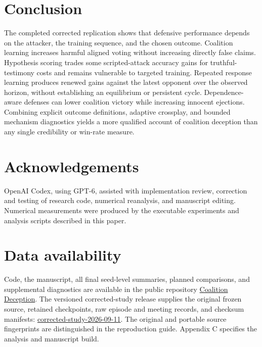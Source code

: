 \documentclass[
  12pt,
]{article}
\begin{document}
\FloatBarrier

\section{Conclusion}\label{conclusion}

The completed corrected replication shows that defensive performance
depends on the attacker, the training sequence, and the chosen outcome.
Coalition learning increases harmful aligned voting without increasing
directly false claims. Hypothesis scoring trades some scripted-attack
accuracy gains for truthful-testimony costs and remains vulnerable to
targeted training. Repeated response learning produces renewed gains
against the latest opponent over the observed horizon, without
establishing an equilibrium or persistent cycle. Dependence-aware
defenses can lower coalition victory while increasing innocent
ejections. Combining explicit outcome definitions, adaptive crossplay,
and bounded mechanism diagnostics yields a more qualified account of
coalition deception than any single credibility or win-rate measure.

\FloatBarrier

\section*{Acknowledgements}\label{acknowledgements}

OpenAI Codex, using GPT-6, assisted with implementation review,
correction and testing of research code, numerical reanalysis, and
manuscript editing. Numerical measurements were produced by the
executable experiments and analysis scripts described in this paper.

\FloatBarrier

\section*{Data availability}\label{data-availability}

Code, the manuscript, all final seed-level summaries, planned
comparisons, and supplemental diagnostics are available in the public
repository
\href{https://github.com/IsaacLin247/coalition-deception}{Coalition
Deception}. The versioned corrected-study release supplies the original
frozen source, retained checkpoints, raw episode and meeting records,
and checksum manifests:
\href{https://github.com/IsaacLin247/coalition-deception/releases/tag/corrected-study-2026-09-11}{corrected-study-2026-09-11}.
The original and portable source fingerprints are distinguished in the
reproduction guide. Appendix C specifies the analysis and manuscript
build.
\end{document}

